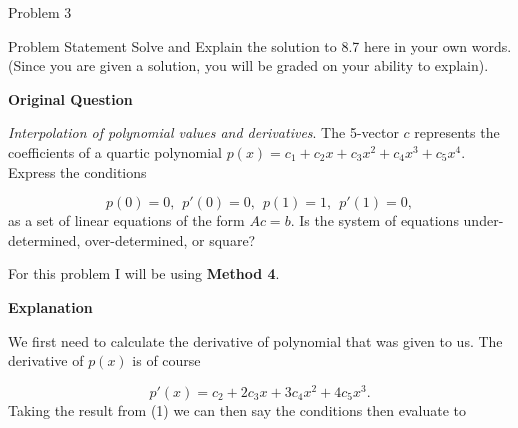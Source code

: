 \begin{problem}{Problem 3}
    \begin{statement}{Problem Statement}
        Solve and Explain the solution to 8.7 here in your own words. (Since you are given a solution, you will be graded on your ability to explain). \vspace*{1em}

        \noindent \textbf{Original Question} \vspace*{1em}

        \textit{Interpolation of polynomial values and derivatives}. The 5-vector $c$ represents the coefficients of a quartic polynomial $p(x) = c_{1} + c_{2}x + c_{3}x^{2} + c_{4}x^{3} + c_{5}x^{4}$. Express the conditions

        \begin{equation*}
            p(0) = 0, \hspace{5pt} p'(0) = 0, \hspace{5pt} p(1) = 1, \hspace{5pt} p'(1) = 0,
        \end{equation*}
        as a set of linear equations of the form $Ac = b$. Is the system of equations under-determined, over-determined, or square?
    \end{statement}

    \begin{Highlight}[Solution]
        For this problem I will be using \textbf{Method 4}. \vspace*{1em}

        \noindent \textbf{Explanation} \vspace*{1em}

        We first need to calculate the derivative of polynomial that was given to us. The derivative of $p(x)$ is of course

        \setcounter{equation}{0}
        \begin{equation}
            p'(x) = c_{2} + 2c_{3}x + 3c_{4}x^{2} + 4c_{5}x^{3}.
        \end{equation}
        Taking the result from (1) we can then say the conditions then evaluate to


\end{Highlight}
\end{problem}
